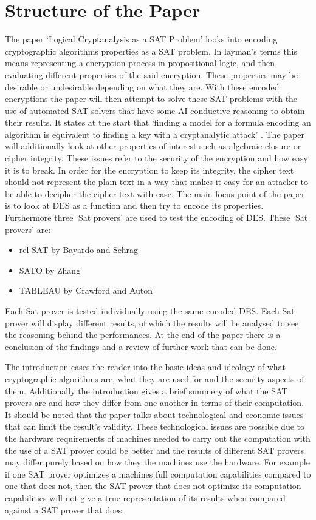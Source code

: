 \documentclass[11pt,a4paper, notitlepage]{report}
\begin{document}
\section{Structure of the Paper}
\label{sec:StrucPaper}

The paper `Logical Cryptanalysis as a SAT Problem' \cite{Fabio2000LogicalSAT} looks into encoding cryptographic algorithms properties as a SAT problem. In layman's terms this means representing a encryption process in propositional logic, and then evaluating different properties of the said encryption. These properties may be desirable or undesirable depending on what they are. With these encoded encryptions the paper will then attempt to solve these SAT problems with the use of automated SAT solvers that have some AI conductive reasoning to obtain their results. It states at the start that `finding a model for a formula encoding an algorithm is equivalent to finding a key with a cryptanalytic attack' \cite{Fabio2000LogicalSAT}. The paper will additionally look at other properties of interest such as algebraic closure or cipher integrity. These issues refer to the security of the encryption and how easy it is to break. In order for the encryption to keep its integrity, the cipher text should not represent the plain text in a way that makes it easy for an attacker to be able to decipher the cipher text with ease. The main focus point of the paper is to look at DES as a function and then try to encode its properties. Furthermore three `Sat provers' are used to test the encoding of DES. These `Sat provers' are:

\begin{itemize}
  \item rel-SAT by Bayardo and Schrag
  \item SATO by Zhang
  \item TABLEAU by Crawford and Auton
\end{itemize}
Each Sat prover is tested individually using the same encoded DES. Each Sat prover will display different results, of which the results will be analysed to see the reasoning behind the performances. At the end of the paper there is a conclusion of the findings and a review of further work that can be done. 

The introduction eases the reader into the basic ideas and ideology of what cryptographic algorithms are, what they are used for and the security aspects of them. Additionally the introduction gives a brief summery of what the SAT provers are and how they differ from one another in terms of their computation. It should be noted that the paper talks about technological and economic issues that can limit the result's validity. These technological issues are possible due to the hardware requirements of machines needed to carry out the computation with the use of a SAT prover could be better and the results of different SAT provers may differ purely based on how they the machines use the hardware. For example if one SAT prover optimizes a machines full computation capabilities compared to one that does not, then the SAT prover that does not optimize its computation capabilities will not give a true representation of its results when compared against a SAT prover that does. 
\end{document}
